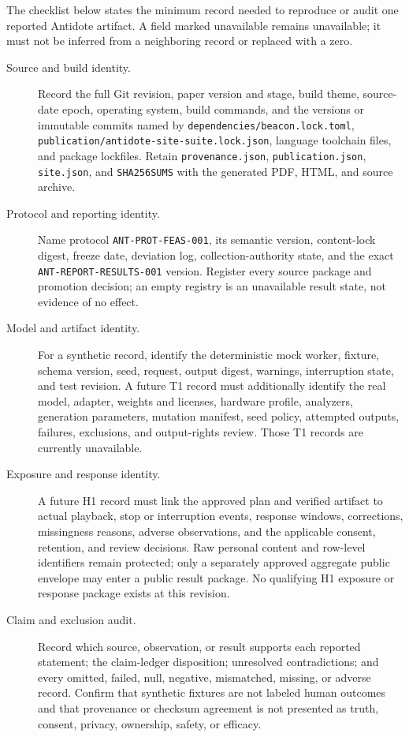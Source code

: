 The checklist below states the minimum record needed to reproduce or audit one
reported Antidote artifact. A field marked unavailable remains unavailable; it
must not be inferred from a neighboring record or replaced with a zero.

\begin{description}
  \item[Source and build identity.] Record the full Git revision, paper version
    and stage, build theme, source-date epoch, operating system, build commands,
    and the versions or immutable commits named by
    \texttt{dependencies/beacon.lock.toml},
    \texttt{publication/antidote-site-suite.lock.json}, language toolchain
    files, and package lockfiles. Retain \texttt{provenance.json},
    \texttt{publication.json}, \texttt{site.json}, and
    \texttt{SHA256SUMS} with the generated PDF, HTML, and source archive.

  \item[Protocol and reporting identity.] Name protocol
    \texttt{ANT-PROT-FEAS-001}, its semantic version, content-lock digest,
    freeze date, deviation log, collection-authority state, and the exact
    \texttt{ANT-REPORT-RESULTS-001} version. Register every source package and
    promotion decision; an empty registry is an unavailable result state, not
    evidence of no effect.

  \item[Model and artifact identity.] For a synthetic record, identify the
    deterministic mock worker, fixture, schema version, seed, request, output
    digest, warnings, interruption state, and test revision. A future T1 record
    must additionally identify the real model, adapter, weights and licenses,
    hardware profile, analyzers, generation parameters, mutation manifest,
    seed policy, attempted outputs, failures, exclusions, and output-rights
    review. Those T1 records are currently unavailable.

  \item[Exposure and response identity.] A future H1 record must link the
    approved plan and verified artifact to actual playback, stop or
    interruption events, response windows, corrections, missingness reasons,
    adverse observations, and the applicable consent, retention, and review
    decisions. Raw personal content and row-level identifiers remain protected;
    only a separately approved aggregate public envelope may enter a public
    result package. No qualifying H1 exposure or response package exists at
    this revision.

  \item[Claim and exclusion audit.] Record which source, observation, or result
    supports each reported statement; the claim-ledger disposition; unresolved
    contradictions; and every omitted, failed, null, negative, mismatched,
    missing, or adverse record. Confirm that synthetic fixtures are not labeled
    human outcomes and that provenance or checksum agreement is not presented
    as truth, consent, privacy, ownership, safety, or efficacy.
\end{description}

